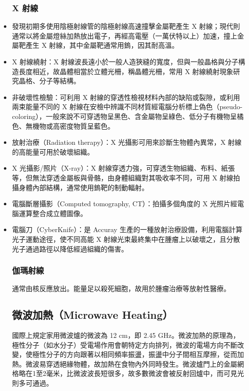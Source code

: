 \documentclass[a4paper,12pt]{report}
\begin{document}
\begin{itemize}
\subsubsection{X 射線}
\bit
\item 發現初期多使用陰極射線管的陰極射線高速撞擊金屬靶產生 X 射線；現代則通常以將金屬燈絲加熱放出電子，再經高電壓（一萬伏特以上）加速，撞上金屬靶產生 X 射線，其中金屬靶通常用鎢，因其耐高溫。
\item X 射線繞射：X 射線波長遠小於一般人造狹縫的寬度，但與一般晶格與分子構造長度相近，故晶體相當於立體光柵，稱晶體光柵，常用 X 射線繞射現象研究晶格、分子等結構。
\item 非破壞性檢驗：可利用 X 射線的穿透性檢視材料內部的缺陷或裂隙，或利用兩束能量不同的 X 射線在安檢中辨識不同材質經電腦分析標上偽色（pseudo-coloring），一般來說不可穿透物呈黑色、含金屬物呈綠色、低分子有機物呈橘色、無機物或高密度物質呈藍色。
\item 放射治療（Radiation therapy）：X 光攝影可用來診斷生物體內異常，X 射線的高能量可用於破壞組織。
\bit
\item X 光攝影/照片（X-ray）：X 射線穿透力強，可穿透生物組織、布料、紙張等，但無法穿透金屬板與骨骼，由身體組織對其吸收率不同，可用 X 射線拍攝身體內部結構，通常使用鎢靶的制動輻射。
\item 電腦斷層攝影（Computed tomography, CT）：拍攝多個角度的 X 光照片經電腦運算整合成立體圖像。
\item 電腦刀（CyberKnife）：是 Accuray 生產的一種放射治療設備，利用電腦計算光子運動途徑，使不同高能 X 射線光束最終集中在腫瘤上以破壞之，且分散光子通過路徑以降低經過組織的傷害。
\eit
\eit
\subsubsection{伽瑪射線}
通常由核反應放出。能量足以殺死細胞，故用於腫瘤治療等放射性醫療。
\subsection{微波加熱（Microwave Heating）}
國際上規定家用微波爐的微波為 12 cm，即 2.45 GHz。微波加熱的原理為，極性分子（如水分子）受電場作用會朝特定方向排列，微波的電場方向不斷改變，使極性分子的方向跟著以相同頻率振盪，振盪中分子間相互摩擦，從而加熱。微波易穿透絕緣物體，故加熱在食物內外同時發生。微波爐門上的金屬網格略在1至2毫米，比微波波長短很多，故多數微波會被反射回爐中，而可見光則多可通過。

\end{itemize}
\end{document}

